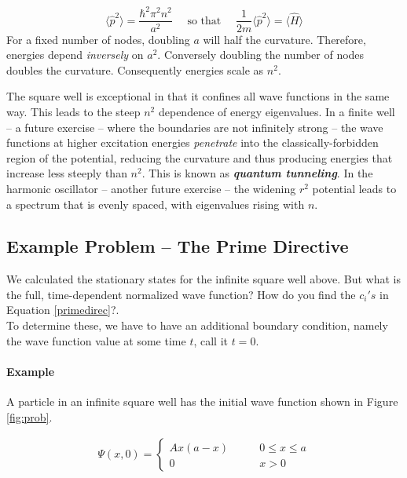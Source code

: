 \[
  \langle \hat{p}^2 \rangle = \frac{\hbar^2 \pi^2 n^2}{a^2} \quad \text{ so
  that }  \quad \frac{1}{2m}\langle \hat{p}^2 \rangle = \langle \hat{H} \rangle 
\] \vspace{3px}
For a fixed number of nodes, doubling $a$ will half the curvature. Therefore,
energies depend \textit{inversely} on $a^2$. Conversely doubling the number of
nodes doubles the curvature. Consequently energies scale as $n^2$. 

The square well is exceptional in that it confines all wave functions in the
same way. This leads to the steep $n^2$ dependence of energy eigenvalues. In
a finite well -- a future exercise -- where the boundaries are not infinitely
strong -- the wave functions at higher excitation energies \textit{penetrate}
into the classically-forbidden region of the potential, reducing the curvature
and thus producing energies that increase less steeply than $n^2$. This is
known as \textit{\textbf{quantum tunneling}}. In the harmonic oscillator --
another future exercise -- the widening $r^2$ potential leads to a spectrum
that is evenly spaced, with eigenvalues rising with $n$. 

\subsection{Example Problem -- The Prime Directive}

We calculated the stationary states for the infinite square well above. But
what is the full, time-dependent normalized wave function? How do you find the
$c_i's$ in Equation \ref{primedirec}?. \\

To determine these, we have to have an additional boundary condition, namely
the wave function value at some time  $t$, call it $t=0$. 

\paragraph{Example} A particle in an infinite square well has the initial wave
function shown in Figure \ref{fig:prob}.

\begin{align} \label{theproblem}
  \Psi(x, 0) = \begin{cases}
    Ax(a-x) &\qquad 0 \leq x \leq a \\ 0 &\qquad x > 0
  \end{cases} 
\end{align}\vspace{3px}

